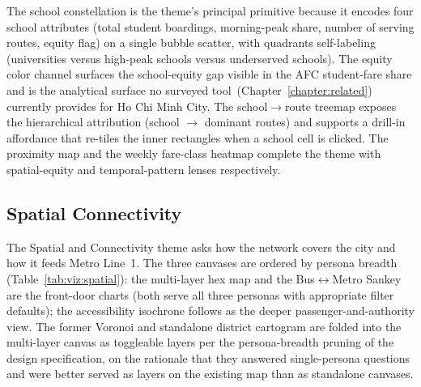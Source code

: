 The school constellation is the theme's principal primitive because it
encodes four school attributes (total student boardings, morning-peak
share, number of serving routes, equity flag) on a single bubble
scatter, with quadrants self-labeling (universities versus
high-peak schools versus underserved schools). The equity color
channel surfaces the school-equity gap visible in the AFC student-fare
share and is the analytical surface no surveyed
tool~(Chapter~\ref{chapter:related}) currently provides for Ho Chi
Minh City. The school$\rightarrow$route treemap exposes the
hierarchical attribution (school $\rightarrow$ dominant routes) and
supports a drill-in affordance that re-tiles the inner rectangles
when a school cell is clicked. The proximity map and the weekly
fare-class heatmap complete the theme with spatial-equity and
temporal-pattern lenses respectively.

\subsection*{Spatial Connectivity}
\label{sec:solution:viz:spatial}

The Spatial and Connectivity theme asks how the network covers the
city and how it feeds Metro Line~1. The three canvases are ordered by
persona breadth (Table~\ref{tab:viz:spatial}): the multi-layer hex
map and the Bus$\leftrightarrow$Metro Sankey are the front-door
charts (both serve all three personas with appropriate filter
defaults); the accessibility isochrone follows as the deeper
passenger-and-authority view. The former Voronoi and standalone
district cartogram are folded into the multi-layer canvas as
toggleable layers per the persona-breadth pruning of the design
specification, on the rationale that they answered single-persona
questions and were better served as layers on the existing map than as
standalone canvases.

